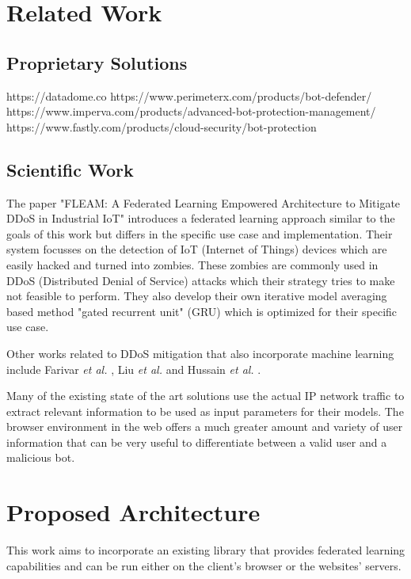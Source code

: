 \documentclass[
    fontsize=12pt,
    headings=small,
    parskip=half,           %
    bibliography=totoc,
    numbers=noenddot,       %
    open=any,               %
    ]{scrreprt}
\begin{document}
\chapter{Related Work}

\section{Proprietary Solutions}

https://datadome.co
https://www.perimeterx.com/products/bot-defender/
https://www.imperva.com/products/advanced-bot-protection-management/
https://www.fastly.com/products/cloud-security/bot-protection

\section{Scientific Work}

The paper "FLEAM: A Federated Learning Empowered Architecture to Mitigate DDoS in Industrial IoT" \cite{LiJi2021} introduces a federated learning approach similar to the goals of this work but differs in the specific use case and implementation. Their system focusses on the detection of IoT (Internet of Things) devices which are easily hacked and turned into zombies. These zombies are commonly used in DDoS (Distributed Denial of Service) attacks which their strategy tries to make not feasible to perform. They also develop their own iterative model averaging based method "gated recurrent unit" (GRU) which is optimized for their specific use case.

Other works related to DDoS mitigation that also incorporate machine learning include Farivar \emph{et al.} \cite{FaFa2020}, Liu \emph{et al.} \cite{8594641} and Hussain \emph{et al.} \cite{9000893}.

Many of the existing state of the art solutions use the actual IP network traffic to extract relevant information to be used as input parameters for their models. The browser environment in the web offers a much greater amount and variety of user information that can be very useful to differentiate between a valid user and a malicious bot.


\chapter{Proposed Architecture}

This work aims to incorporate an existing library that provides federated learning capabilities and can be run either on the client's browser or the websites' servers.
\end{document}
